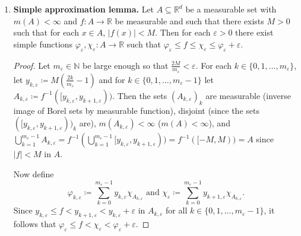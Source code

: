 \begin{enumerate}
	\begin{proof}\renewcommand{\qedsymbol}{}
	Let \( c \in \mathbb{R} \) be fixed. Let \( \mathcal{O} \coloneqq g^{-1}((-\infty, c))  \) so that \( \mathcal{O}  \) is open as \( g \) is continuous hence preimages of open sets are open. Thus \( (g \circ f )^{-1}((-\infty,c)) = f^{-1}(g^{-1}((-\infty,c)) )  = f^{-1}(\mathcal{O} )  \) is measurable as \( \mathcal{O} 	 \) is Borel.
	\end{proof}
\item \textbf{Simple approximation lemma.} Let \( A \subseteq \mathbb{R}^{d}  \) be a measurable set with \( m(A) < \infty \) and \( f : A \to \mathbb{R} \) be measurable and such that there exists \( M > 0 \) such that for each \( x \in A \), \( |f(x)| < M \). Then for each \( \varepsilon > 0 \) there exist simple functions \( \varphi_\varepsilon, \chi_\varepsilon  : A \to \mathbb{R} \) such that \(\varphi_\varepsilon  \leq f \leq \chi_\varepsilon \leq \varphi_\varepsilon  + \varepsilon .\)
	\begin{proof}\renewcommand{\qedsymbol}{}
	Let \( m_\varepsilon  \in \mathbb{N}  \) be large enough so that \( \frac{2M}{m_\varepsilon } < \varepsilon  \). For each \( k \in \{ 0, 1, \hdots , m_\varepsilon  \}  \), let \( y_{k,\varepsilon } \coloneqq M\left(\frac{2k}{m_\varepsilon } - 1\right)  \) and for \( k \in \{ 0,1,\hdots ,m_\varepsilon -1 \}  \) let \( A_{k, \varepsilon } \coloneqq f^{-1}([y_{k,\varepsilon }, y_{k+1,\varepsilon } ) )  \). Then the sets \( (A_{k,\varepsilon } )_k \) are measurable (inverse image of Borel sets by measurable function), disjoint (since the sets \( ([y_{k,\varepsilon } , y_{k+1, \varepsilon } ))_k \) are), \( m(A_{k,\varepsilon } ) < \infty \) (\( m(A) < \infty \)), and \( \bigcup_{k=1}^{m_\varepsilon  - 1} A_{k,\varepsilon } = f^{-1}(\bigcup_{k=1}^{m_\varepsilon  - 1} [y_{k,\varepsilon } , y_{k+1, \varepsilon } ) )   = f^{-1}([-M,M))= A \) since \( |f| <M   \) in \( A \).

Now define \[ \varphi_{k,\varepsilon } \coloneqq \sum_{k = 0}^{m_\varepsilon  - 1} y_{k,\varepsilon }\chi_{A_{k,\varepsilon } }    \mbox{ and } \chi_\varepsilon \coloneqq  \sum_{k=0}^{m_\varepsilon  - 1} y_{k+1, \varepsilon }\chi_{A_{k, \varepsilon } } .  \] Since \( y_{k,\varepsilon } \leq f < y_{k+1, \varepsilon } < y_{k,\varepsilon } + \varepsilon   \) in \( A_{k,\varepsilon }  \) for all \( k \in \{ 0, 1, \hdots , m_\varepsilon -  1 \}  \), it follows that \( \varphi_\varepsilon \leq f < \chi_\varepsilon < \varphi _\varepsilon + \varepsilon  \).


\end{proof}
\end{enumerate}
